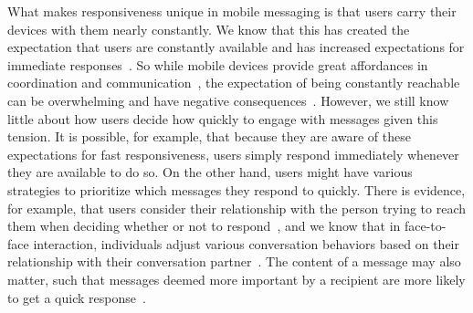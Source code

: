 \documentclass[12pt]{nuthesis}	%
\begin{document}
What makes responsiveness unique in mobile messaging is that users carry their devices with them nearly constantly. We know that this has created the expectation that users are constantly available and has increased expectations for immediate responses~\citep{church2013s}. So while mobile devices provide great affordances in coordination and communication~\citep{ling200210}, the expectation of being constantly reachable can be overwhelming and have negative consequences~\citep{hall2012calling}. However, we still know little about how users decide how quickly to engage with messages given this tension. It is possible, for example, that because they are aware of these expectations for fast responsiveness, users simply respond immediately whenever they are available to do so. On the other hand, users might have various strategies to prioritize which messages they respond to quickly. There is evidence, for example, that users consider their relationship with the person trying to reach them when deciding whether or not to respond~\citep{wohn2015ambient}, and we know that in face-to-face interaction, individuals adjust various conversation behaviors based on their relationship with their conversation partner~\citep{brown1987politeness,locher2005politeness}. The content of a message may also matter, such that messages deemed more important by a recipient are more likely to get a quick response~\citep{dabbish2005understanding}.
\end{document}
